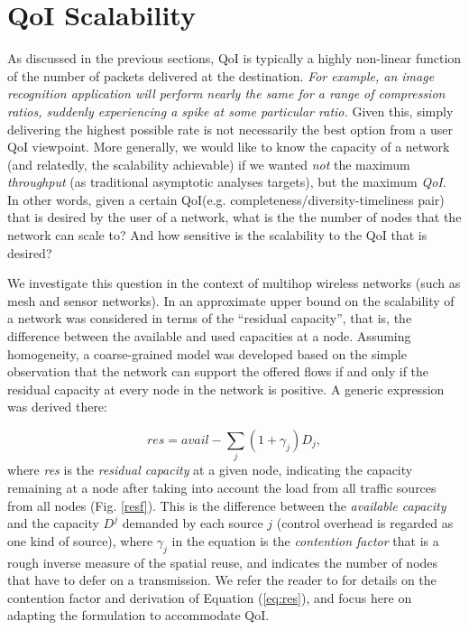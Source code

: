 
\section{QoI Scalability}
\label{sec:qoi_scalability}


As discussed in the previous sections, QoI %
is typically a highly
non-linear function of the number of packets delivered at the
destination.  \emph{For example, an image recognition application will
perform nearly the same for a range of compression ratios, suddenly
experiencing a spike at some particular ratio.} Given this, simply
delivering the highest possible rate is not necessarily the best
option from a user QoI viewpoint. More generally, we would like to know
the capacity of a network (and relatedly, the scalability achievable)
if we wanted {\em not} the maximum {\em throughput} (as traditional
asymptotic analyses targets), but the maximum {\em QoI}. In other
words, given a certain QoI(e.g. completeness/diversity-timeliness pair) that is desired by the  user of a network,
what is the the number of nodes that the network can scale to? And how
sensitive is the scalability to the QoI that is desired?

We investigate this question in the context of multihop wireless networks
(such as mesh and sensor networks).
In \cite{Ramanathan10} an approximate upper bound on the
 scalability of a network was
considered in terms of the ``residual capacity'', that is, the difference
between the available and used capacities at a node. Assuming homogeneity, a
coarse-grained model was developed based on the simple observation
that the network can support the offered flows if and only if the
residual capacity at every node in the network is positive.  A generic
expression was derived there:


\begin{equation}
res = avail - \sum_j (1+\gamma_j)D_j,
\label{eq:res}
\end{equation}
where \emph{res} is the {\em residual capacity} at a given node, indicating
the capacity remaining at a node after taking into account the load
from all traffic sources from all nodes (Fig. \ref{resf}). This is the difference
between the {\em available capacity} and the capacity $D^j$
demanded by
each source $j$ (control overhead is regarded as one kind of
source), where $\gamma_j$ in the equation is the {\em contention factor} that is a rough inverse
measure of the spatial reuse, and indicates the number of  nodes that have
to defer on a transmission.
We refer the reader to \cite{Ramanathan10} for details on the contention factor
and derivation of Equation (\ref{eq:res}), and focus here on adapting the
formulation to accommodate QoI.

